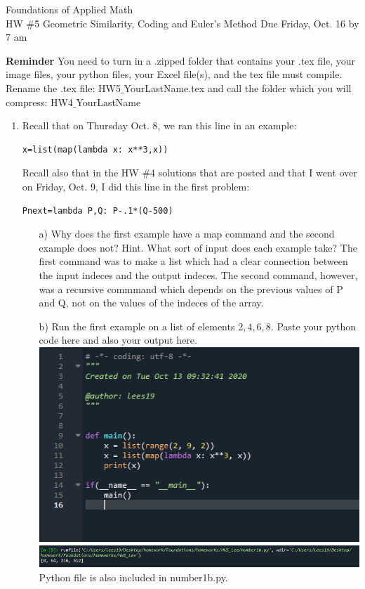 \documentclass[12pt,letterpaper]{article}
\begin{document}
Foundations of Applied Math\\
 HW \#5 Geometric Similarity, Coding and Euler's Method
 Due Friday, Oct. 16 by 7 am

\textbf{Reminder} You need to turn in a .zipped folder that contains your .tex file, your image files, your python files, your Excel file(s), and the tex file must compile.
Rename the .tex file: HW5$\_$YourLastName.tex and call the folder which you will compress: HW4$\_$YourLastName


\begin{enumerate}

\item 
Recall that on Thursday Oct. 8, we ran this line in an example:
\begin{verbatim}
x=list(map(lambda x: x**3,x))
\end{verbatim}

\vspace{1em}
Recall also that in the HW \#4 solutions that are posted and that I went over on Friday, Oct. 9, I did this line in the first problem:

\begin{verbatim}
Pnext=lambda P,Q: P-.1*(Q-500) 
\end{verbatim}

\begin{enumerate}
\item[a)]  Why does the first example have a map command and the second example does not? Hint. What sort of input does each example take?
  The first command was to make a list which had a clear connection between the input indeces 
  and the output indeces. The second command, however, was a recursive commmand which depends
  on the previous values of P and Q, not on the values of the indeces of the array. 
\item[b)] Run the first example on a list of elements $2, 4, 6, 8$. Paste your python code here and also your output here. \\
  \includegraphics{number1bcode.png}\\
  \includegraphics[scale = .7]{number1b.png}\\
  Python file is also included in number1b.py. 


\end{enumerate}
\end{enumerate}
\end{document}
